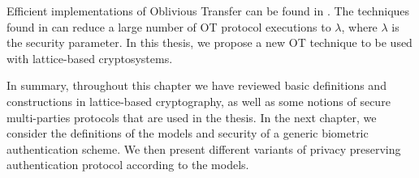 
Efficient implementations of Oblivious Transfer can be found in
\cite{naor2001efficient35}. The techniques found in \cite{ishai2003extending24}
can reduce a large number of OT protocol executions to \(\lambda\), where
\(\lambda\) is the security parameter. In this thesis, we propose a new OT
technique to be used with lattice-based cryptosystems.

In summary, throughout this chapter we have reviewed basic definitions and
constructions in lattice-based cryptography, as well as some notions of secure
multi-parties protocols that are used in the thesis. In the next chapter, we
consider the definitions of the models and security of a generic biometric
authentication scheme. We then present different variants of privacy preserving
authentication protocol according to the models.

